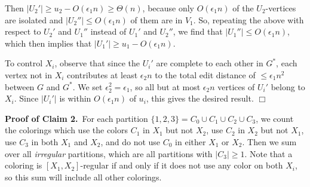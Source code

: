\documentclass[11pt]{article}
\begin{document}
Then $|U_2'| \geq u_2 - O(\epsilon_1 n) \geq \Theta(n)$, because only
$O(\epsilon_1 n)$ of the $U_2$-vertices are isolated and $|U_2''| \leq
O(\epsilon_1 n)$ of them are in $V_1$.  So, repeating the above with
respect to $U_2'$ and $U_1''$ instead of $U_1'$ and $U_2''$, we find
that $|U_1''| \leq O(\epsilon_1 n)$, which then implies that $|U_1'|
\geq u_1 - O(\epsilon_1 n)$.

To control $X_i$, observe that since the $U_i'$ are complete to each
other in $G^*$, each vertex not in $X_i$ contributes at least
$\epsilon_2 n$ to the total edit distance of $\leq \epsilon_1 n^2$
between $G$ and $G^*$.  We set $\epsilon_2^2 = \epsilon_1$, so all but
at most $\epsilon_2 n$ vertices of $U_i'$ belong to $X_i$.  Since
$|U_i'|$ is within $O(\epsilon_1 n)$ of $u_i$, this gives the desired
result.  \hfill $\Box$



\vspace{3mm}

\noindent \textbf{Proof of Claim 2.}\, For each partition $\{1, 2, 3\}
= C_0 \cup C_1 \cup C_2 \cup C_3$, we count the colorings which use
the colors $C_1$ in $X_1$ but not $X_2$, use $C_2$ in $X_2$ but not
$X_1$, use $C_3$ in both $X_1$ and $X_2$, and do not use $C_0$ in
either $X_1$ or $X_2$.  Then we sum over all \emph{irregular}\/
partitions, which are all partitions with $|C_3| \geq 1$.  Note that a
coloring is $[X_1, X_2]$-regular if and only if it does not use any
color on both $X_i$, so this sum will include all other colorings.
\end{document}
